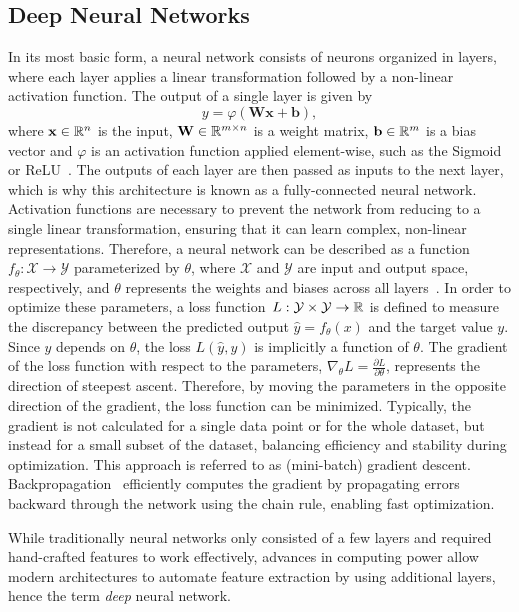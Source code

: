 \subsection{Deep Neural Networks}

In its most basic form, a neural network consists of neurons organized in layers, where each layer applies a linear transformation followed by a non-linear activation function.
The output of a single layer is given by
\begin{equation}
    y = \varphi(\mathbf{W}\mathbf{x} + \mathbf{b}),
\end{equation}
where $\mathbf{x} \in \mathbb{R}^n$ is the input, $\mathbf{W} \in \mathbb{R}^{m \times n}$ is a weight matrix, $\mathbf{b} \in \mathbb{R}^m$ is a bias vector and $\varphi$ is an activation function applied element-wise, such as the Sigmoid or ReLU~\cite{ReLU}.
The outputs of each layer are then passed as inputs to the next layer, which is why this architecture is known as a fully-connected neural network. 
Activation functions are necessary to prevent the network from reducing to a single linear transformation, ensuring that it can learn complex, non-linear representations.
Therefore, a neural network can be described as a function~$f_{\theta}: \mathcal{X} \rightarrow \mathcal{Y}$ parameterized by $\theta$, where $\mathcal{X}$ and $\mathcal{Y}$ are input and output space, respectively, and $\theta$ represents the weights and biases across all layers~\cite{DeepLearning}.
In order to optimize these parameters, a loss function~$L: \mathcal{Y} \times \mathcal{Y} \rightarrow \mathbb{R}$ is defined to measure the discrepancy between the predicted output $\hat{y} = f_\theta(x)$ and the target value $y$. 
Since $\hat{y}$ depends on $\theta$, the loss $L(\hat{y}, y)$ is implicitly a function of $\theta$.
The gradient of the loss function with respect to the parameters, $\nabla_\theta L = \frac{\partial L}{\partial \theta}$, represents the direction of steepest ascent.
Therefore, by moving the parameters in the opposite direction of the gradient, the loss function can be minimized.
Typically, the gradient is not calculated for a single data point or for the whole dataset, but instead for a small subset of the dataset, balancing efficiency and stability during optimization.
This approach is referred to as (mini-batch) gradient descent.
Backpropagation~\cite{Backpropagation} efficiently computes the gradient by propagating errors backward through the network using the chain rule, enabling fast optimization.

While traditionally neural networks only consisted of a few layers and required hand-crafted features to work effectively, advances in computing power allow modern architectures to automate feature extraction by using additional layers, hence the term \textit{deep} neural network.


